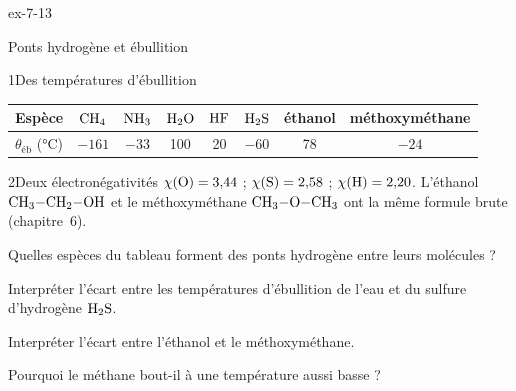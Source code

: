 \begin{blocLivre}{ex-7-13}
\begin{exercice}[3]{Ponts hydrogène et ébullition}
\begin{docu}{1}{Des températures d'ébullition}
\par\smallskip\noindent\hfill\begin{tabular}{lccccccc}
\toprule
Espèce & $\ce{CH4}$ & $\ce{NH3}$ & $\ce{H2O}$ & $\ce{HF}$ & $\ce{H2S}$ & éthanol & méthoxyméthane \\
\midrule
$\theta_\text{éb}$ (\unit{\degreeCelsius}) & $-161$ & $-33$ & 100 & 20 & $-60$ & 78 & $-24$ \\
\bottomrule
\end{tabular}\hfill\null\par\smallskip
\end{docu}
\begin{docu}{2}{Deux électronégativités}
$\chi(\ce{O})=3{,}44$ ; $\chi(\ce{S})=2{,}58$ ; $\chi(\ce{H})=2{,}20$. L'éthanol $\ce{CH3-CH2-OH}$ et le méthoxyméthane $\ce{CH3-O-CH3}$ ont la même
formule brute (chapitre~6).
\end{docu}
\begin{questions}
\item Quelles espèces du tableau forment des ponts hydrogène entre leurs molécules ?
\item Interpréter l'écart entre les températures d'ébullition de l'eau et du sulfure d'hydrogène $\ce{H2S}$.
\item Interpréter l'écart entre l'éthanol et le méthoxyméthane.
\item \initiative Pourquoi le méthane bout-il à une température aussi basse ?
\end{questions}
\end{exercice}
\end{blocLivre}
